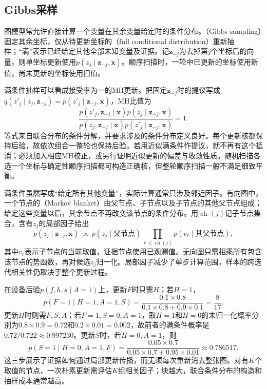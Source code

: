 \subsection{Gibbs采样}
\label{sec:pgm-sampling-gibbs}

图模型常允许直接计算一个变量在其余变量给定时的条件分布。（Gibbs sampling）固定其余坐标，仅从待更新坐标的（full conditional distribution）重新抽样；“满”表示已经给定其他全部未知变量及证据。记$\bm{z}_{-j}$为去掉第$j$个坐标后的向量，则单坐标更新使用$p(z_j\mid\bm{z}_{-j},\bm{x})$。顺序扫描时，一轮中已更新的坐标使用新值，尚未更新的坐标使用旧值。

满条件抽样可以看成接受率为一的MH更新。把固定$\bm{z}_{-j}$时的提议写成$q(z'_j\mid z_j,\bm{z}_{-j})=p(z'_j\mid\bm{z}_{-j},\bm{x})$，MH比值为
\begin{equation}
  \frac{p(z'_j,\bm{z}_{-j}\mid\bm{x})p(z_j\mid\bm{z}_{-j},\bm{x})}
       {p(z_j,\bm{z}_{-j}\mid\bm{x})p(z'_j\mid\bm{z}_{-j},\bm{x})}
    =1.
  \label{eq:pgm-sampling-gibbs-acceptance}
\end{equation}
等式来自联合分布的条件分解，并要求涉及的条件分布定义良好。每个更新核都保持后验，故依次组合一整轮也保持后验。若用近似满条件作提议，就不再有这个抵消；必须加入相应MH校正，或另行证明近似更新的偏差与收敛性质。随机扫描各选一个坐标与确定性顺序扫描都可构造正确核，但整轮顺序扫描一般不满足细致平衡。

满条件虽然写成“给定所有其他变量”，实际计算通常只涉及邻近因子。有向图中，一个节点的（Markov blanket）由父节点、子节点以及子节点的其他父节点组成；给定这些变量以后，其余节点不再改变该节点的条件分布。用$\operatorname{ch}(j)$记子节点集合，含有$z_j$的局部因子给出
\[
  p(z_j\mid\bm{z}_{-j},\bm{x})
    \ \propto\ p(z_j\mid\text{父节点})
       \prod_{\ell\in\operatorname{ch}(j)}
          p(v_\ell\mid\text{其父节点}),
\]
其中$v_\ell$表示子节点的当前取值，证据节点使用已观测值。无向图只需相乘所有包含该节点的势函数，再对候选$z_j$归一化。局部因子减少了单步计算范围，样本的跨迭代相关性仍取决于整个更新过程。

在设备后验$p(f,h,s\mid A=1)$上，更新$F$时只需$H$；若$H=1$，
\[
  p(F=1\mid H=1,A=1,S)
    =\frac{0.1\times0.8}{0.1\times0.8+0.9\times0.1}
    =\frac{8}{17}.
\]
更新$H$时则需$F,S,A$；若$F=1,S=0,A=1$，取$H=1$和$H=0$的未归一化概率分别为$0.8\times0.9=0.72$和$0.2\times0.01=0.002$，故前者的满条件概率是$0.72/0.722\approx0.997230$。更新$S$时，若$H=0,A=1$，则
\[
  p(S=1\mid H=0,A=1,F)
    =\frac{0.05\times0.7}{0.05\times0.7+0.95\times0.01}
    \approx0.786517.
\]
这三步展示了证据如何通过局部更新传播，而无须每次重新消去整张图。对有$K$个取值的节点，一次朴素更新需评估$K$组相关因子；块越大，联合条件分布的构造和抽样成本通常越高。

